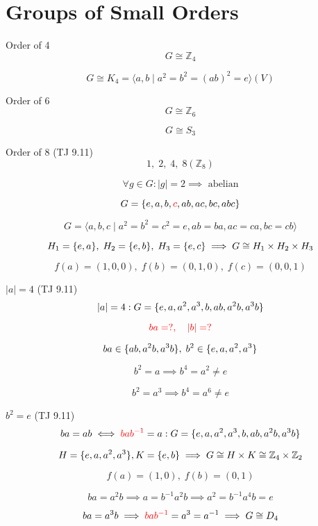 \section{Groups of Small Orders}

\begin{frame}{Order of 4}
  \[
    G \cong \mathbb{Z}_{4}
  \]

  \[
    G \cong K_4 = \langle a, b \mid a^2 = b^2 = (ab)^2 = e \rangle (V)
  \]
\end{frame}
\begin{frame}{Order of 6}
  \[
    G \cong \mathbb{Z}_{6} 
  \]

  \[
    G \cong S_3
  \]
\end{frame}
\begin{frame}{Order of 8 (TJ 9.11)}
  \[
    1,\;2,\;4,\;8 (\mathbb{Z}_{8})
  \]

  \[
    \forall g \in G: |g| = 2 \implies \textrm{ abelian}
  \]

  \[
    G = \{e, a, b, \textcolor{red}{c}, ab, ac, bc, abc\}
  \]

  \[
    G = \langle a, b, c \mid a^2 = b^2 = c^2 = e, ab = ba, ac = ca, bc = cb \rangle
  \]

  \[
    H_1 = \{e, a\},\; H_2 = \{e, b\},\; H_3 = \{e, c\} \implies G \cong H_1 \times H_2 \times H_3
  \]

  \[
    f(a) = (1,0,0),\; f(b) = (0,1,0),\; f(c) = (0,0,1)
  \]
\end{frame}
\begin{frame}{$|a| = 4$ (TJ 9.11)}
  \[
    |a| = 4: G = \{e, a, a^2, a^3, b, ab, a^2b, a^3b\}
  \]

  \[
    \textcolor{red}{ba = ?,\quad |b| = ?}
  \]

  \[
    ba \in \{ab, a^2b, a^3b\},\; b^2 \in \{e, a, a^2, a^3\}
  \]

  \[
    b^2 = a \implies b^4 = a^2 \neq e
  \]

  \[
    b^2 = a^3 \implies b^4 = a^6 \neq e
  \]
\end{frame}
\begin{frame}{$b^2 = e$ (TJ 9.11)}
  \[
    ba = ab \iff \textcolor{red}{bab^{-1}} = a: G = \{e, a, a^2, a^3, b, ab, a^2b, a^3b\}
  \]

  \[
    H = \{e, a, a^2, a^3\}, K = \{e, b\} \implies G \cong H \times K \cong \mathbb{Z}_{4} \times \mathbb{Z}_{2}
  \]

  \[
    f(a) = (1,0),\; f(b) = (0,1)
  \]

  \[
    ba = a^2b \implies a = b^{-1}a^2b \implies a^2 = b^{-1}a^4b = e
  \]

  \[
    ba = a^3b \implies \textcolor{red}{bab^{-1}} = a^3 = a^{-1} \implies G \cong D_4
  \]
\end{frame}
